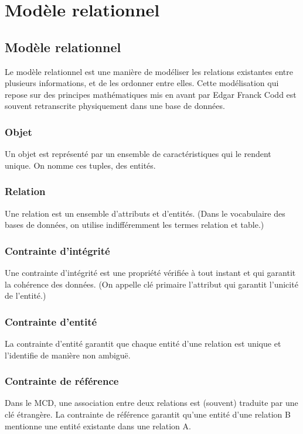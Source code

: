 \documentclass{article}
\begin{document}
\section{Modèle relationnel}

\subsection{Modèle relationnel}
Le modèle relationnel est une manière de modéliser les relations existantes entre plusieurs informations, et de les ordonner entre elles.  
Cette modélisation qui repose sur des principes mathématiques mis en avant par Edgar Franck Codd est souvent retranscrite physiquement dans une base de données.

\subsubsection{Objet}
Un objet est représenté par un ensemble de caractéristiques qui le rendent unique. On nomme ces tuples, des entités.

\subsubsection{Relation}
Une relation est un ensemble d’attributs et d’entités.  
(Dans le vocabulaire des bases de données, on utilise indifféremment les termes relation et table.)

\subsubsection{Contrainte d’intégrité}
Une contrainte d’intégrité est une propriété vérifiée à tout instant et qui garantit la cohérence des données.  
(On appelle clé primaire l’attribut qui garantit l’unicité de l’entité.)

\subsubsection{Contrainte d’entité}
La contrainte d’entité garantit que chaque entité d’une relation est unique et l’identifie de manière non ambiguë.

\subsubsection{Contrainte de référence}
Dans le MCD, une association entre deux relations est (souvent) traduite par une clé étrangère. La contrainte de référence garantit qu’une entité d’une relation B mentionne une entité existante dans une relation A.
\end{document}
